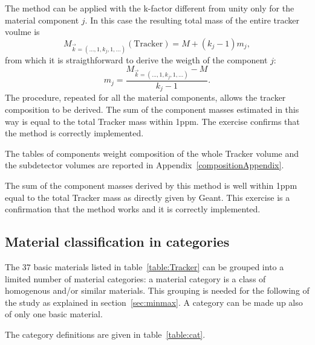 \documentclass{cmspaper}
\begin{document}
The method can be applied with the k-factor different from unity only
for the material component $j$. In this case the resulting total mass
of the entire tracker voulme is 
\begin{equation}
M_{\vec{k}=(..., 1, k_j, 1, ...)} (\mathrm{Tracker}) = M +
( k_j - 1) m_j,
\end{equation}
from which it is straigthforward to derive the weigth of the component $j$: 
\begin{equation}
m_j = \frac{M_{\vec{k}=(..., 1, k_j, 1, ...)} - M}{k_j
  - 1}.
\end{equation}
The procedure, repeated for all the material components, allows the tracker composition to be derived. The sum of the component masses estimated in this way is equal to the total Tracker mass within 1ppm. The exercise confirms that the method is correctly implemented.

The tables of components weight composition of the whole Tracker volume and the subdetector volumes are reported in Appendix~\ref{compositionAppendix}.

The sum of the component masses derived by this method is well within 1ppm equal to the total Tracker mass as directly given by Geant. This exercise is a confirmation that the method works and it is correctly implemented.

\subsection{Material classification in categories}

The $37$ basic materials listed in table~\ref{table:Tracker} can be grouped into a limited number of material categories: a material category is a class of homogenous and/or similar materials. This grouping is needed for the following of the study as explained in section~\ref{sec:minmax}. A category can be made up also of only one basic material.

The category definitions are given in table~\ref{table:cat}.
\end{document}

